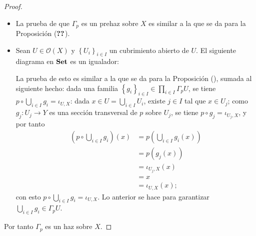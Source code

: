\begin{proof}
   \begin{itemize}
      \item La prueba de que $\Gamma_p$ es un prehaz sobre $X$ es similar a la que se da para la Proposición ($\Ref{Prop:P1}$).
      \item Sean $U\in \mathcal{O}(X)$ y $\left\lbrace U_i\right\rbrace_{i\in I}$ un cubrimiento abierto de $U$. El siguiente diagrama en $\normalfont{\textbf{Set}}$ es un igualador:
         
         La prueba de esto es similar a la que se da para la Proposición (), sumada al siguiente hecho: dada una familia $\left\lbrace g_i\right\rbrace_{i\in I}\in \prod_{i\in I}\Gamma_p U$, se tiene $p\circ \bigcup_{i\in I} g_i=\iota_{U,X}$: dada $x\in U=\bigcup_{i\in I}U_i$, existe $j\in I$ tal que $x\in U_j$; como $g_j:U_j\to Y$ es una sección transversal de $p$ sobre $U_j$, se tiene $p\circ g_j = \iota_{U_j,X}$, y por tanto
         $$
         \begin{aligned}
            \left(p\circ \bigcup_{i\in I}g_i\right)(x)&=p\left( \bigcup_{i\in I}g_i(x)\right)\\
                                           &=p(g_j(x))\\
                                           &=\iota_{U_j,X}(x)\\
                                           &=x\\
                                           &=\iota_{U,X}(x);
         \end{aligned}
         $$
         con esto $p\circ \bigcup_{i\in I}g_i=\iota_{U,X}$. Lo anterior se hace para garantizar $\bigcup_{i\in I}g_i\in \Gamma_p U$.
   \end{itemize}
   Por tanto $\Gamma_p$ es un haz sobre $X$.
\end{proof}

